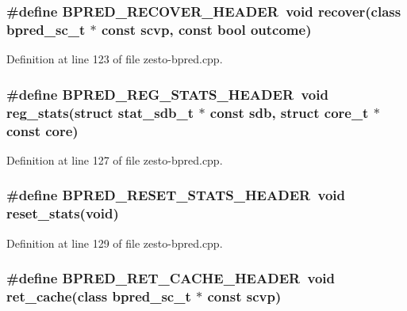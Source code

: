 \subsubsection[{BPRED\_\-RECOVER\_\-HEADER}]{\setlength{\rightskip}{0pt plus 5cm}\#define BPRED\_\-RECOVER\_\-HEADER~void recover(class {\bf bpred\_\-sc\_\-t} $\ast$ const scvp, const bool outcome)}\label{zesto-bpred_8cpp_e7ba40e5a1e4f470a5291e8051511b22}




Definition at line 123 of file zesto-bpred.cpp.
\subsubsection[{BPRED\_\-REG\_\-STATS\_\-HEADER}]{\setlength{\rightskip}{0pt plus 5cm}\#define BPRED\_\-REG\_\-STATS\_\-HEADER~void reg\_\-stats(struct {\bf stat\_\-sdb\_\-t} $\ast$ const sdb, struct {\bf core\_\-t} $\ast$ const core)}\label{zesto-bpred_8cpp_1ef7d1fa5fd090d86fccba4c2687cdab}




Definition at line 127 of file zesto-bpred.cpp.
\subsubsection[{BPRED\_\-RESET\_\-STATS\_\-HEADER}]{\setlength{\rightskip}{0pt plus 5cm}\#define BPRED\_\-RESET\_\-STATS\_\-HEADER~void reset\_\-stats(void)}\label{zesto-bpred_8cpp_cec5d1da0e11b13e55aba95d4c81796e}




Definition at line 129 of file zesto-bpred.cpp.
\subsubsection[{BPRED\_\-RET\_\-CACHE\_\-HEADER}]{\setlength{\rightskip}{0pt plus 5cm}\#define BPRED\_\-RET\_\-CACHE\_\-HEADER~void ret\_\-cache(class {\bf bpred\_\-sc\_\-t} $\ast$ const scvp)}\label{zesto-bpred_8cpp_143bfae163d5f53e2b17a72e6cfeaf1b}




